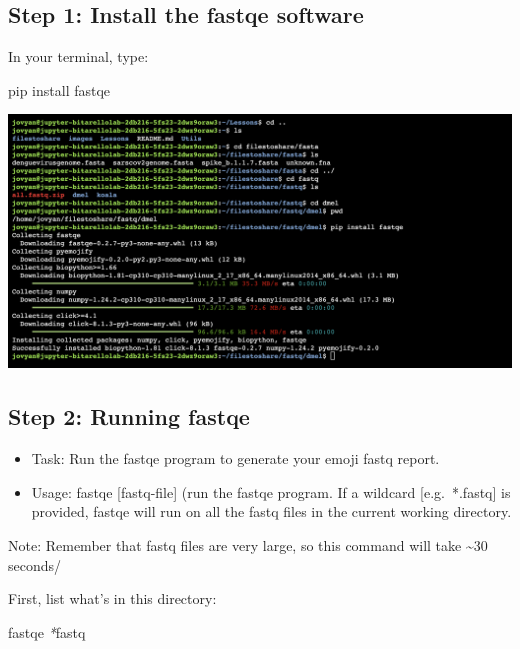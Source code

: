 \documentclass[
]{article}
\newenvironment{Shaded}{\begin{snugshade}}{\end{snugshade}}
\newcommand{\ExtensionTok}[1]{#1}
\newcommand{\NormalTok}[1]{#1}
\newcommand{\PreprocessorTok}[1]{\textcolor[rgb]{0.56,0.35,0.01}{\textit{#1}}}
\begin{document}
\hypertarget{step-1-install-the-fastqe-software}{%
\subsection{Step 1: Install the fastqe
software}\label{step-1-install-the-fastqe-software}}

In your terminal, type:

\begin{Shaded}
\begin{Highlighting}[]
\ExtensionTok{pip}\NormalTok{ install fastqe}
\end{Highlighting}
\end{Shaded}

\includegraphics{images/install_fastqe.png}

\hypertarget{step-2-running-fastqe}{%
\subsection{Step 2: Running fastqe}\label{step-2-running-fastqe}}

\begin{itemize}
\item
  Task: Run the fastqe program to generate your emoji fastq report.
\item
  Usage: fastqe {[}fastq-file{]} (run the fastqe program. If a wildcard
  {[}e.g.~*.fastq{]} is provided, fastqe will run on all the fastq files
  in the current working directory.
\end{itemize}

Note: Remember that fastq files are very large, so this command will
take \textasciitilde30 seconds/

First, list what's in this directory:

\begin{Shaded}
\begin{Highlighting}[]
\ExtensionTok{fastqe} \PreprocessorTok{*}\NormalTok{fastq}
\end{Highlighting}
\end{Shaded}
\end{document}
